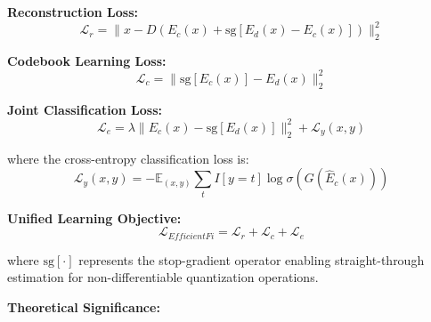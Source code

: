 \documentclass[journal]{IEEEtran}
\begin{document}
\textbf{Reconstruction Loss:}
\begin{equation}
\mathcal{L}_r = \|x - D(E_c(x) + \text{sg}[E_d(x) - E_c(x)])\|_2^2
\label{eq:yang_reconstruction}
\end{equation}

\textbf{Codebook Learning Loss:}
\begin{equation}
\mathcal{L}_c = \|\text{sg}[E_c(x)] - E_d(x)\|_2^2
\label{eq:yang_codebook}
\end{equation}

\textbf{Joint Classification Loss:}
\begin{equation}
\mathcal{L}_e = \lambda\|E_c(x) - \text{sg}[E_d(x)]\|_2^2 + \mathcal{L}_y(x, y)
\label{eq:yang_classification}
\end{equation}

where the cross-entropy classification loss is:
\begin{equation}
\mathcal{L}_y(x, y) = -\mathbb{E}_{(x,y)} \sum_t I[y = t] \log \sigma(G(\hat{E}_c(x)))
\label{eq:yang_crossentropy}
\end{equation}

\textbf{Unified Learning Objective:}
\begin{equation}
\mathcal{L}_{EfficientFi} = \mathcal{L}_r + \mathcal{L}_c + \mathcal{L}_e
\label{eq:yang_unified}
\end{equation}

where $\text{sg}[\cdot]$ represents the stop-gradient operator enabling straight-through estimation for non-differentiable quantization operations.

\textbf{Theoretical Significance:}
\end{document}
